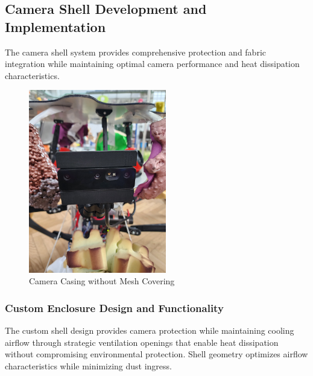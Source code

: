 \subsection{Camera Shell Development and Implementation}

The camera shell system provides comprehensive protection and fabric integration while maintaining optimal camera performance and heat dissipation characteristics.

\begin{figure}[H]
    \centering
    \includegraphics[height=8cm, angle=-90]{Images/CameraCasingNoMesh.jpg}
    \caption{Camera Casing without Mesh Covering}
    \label{fig:camera_casing_no_mesh}
\end{figure}

\subsubsection{Custom Enclosure Design and Functionality}

The custom shell design provides camera protection while maintaining cooling airflow through strategic ventilation openings that enable heat dissipation without compromising environmental protection. Shell geometry optimizes airflow characteristics while minimizing dust ingress.

